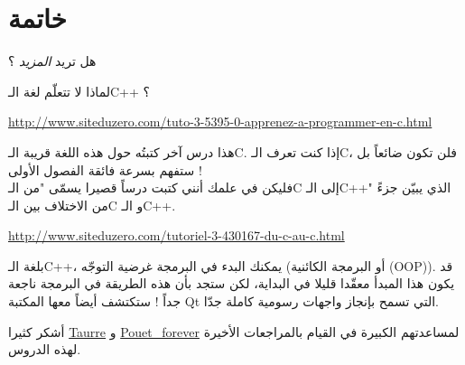 \chapter*{خاتمة}

هل تريد
\textit{المزيد}
؟

لماذا لا تتعلّم لغة الـ\textenglish{C++}
؟

\url{http://www.siteduzero.com/tuto-3-5395-0-apprenez-a-programmer-en-c.html}

 هذا درس آخر كتبتُه حول هذه اللغة قريبة الـ\textenglish{C}.
 إذا كنت تعرف الـ\textenglish{C}،
فلن تكون ضائعاً بل ستفهم بسرعة فائقة الفصول الأولى !\\
فليكن في علمك أنني كتبت درساً قصيرا يسمّى "من الـ\textenglish{C}
إلى الـ\textenglish{C++}"
الذي يبيّن جزءً من الاختلاف بين الـ\textenglish{C}
و الـ\textenglish{C++}.

\url{http://www.siteduzero.com/tutoriel-3-430167-du-c-au-c.html}

بلغة الـ\textenglish{C++}،
يمكنك البدء في البرمجة غرضية التوجّه (أو البرمجة الكائنية
(\textenglish{OOP})).
قد يكون هذا المبدأ معقّدا قليلا في البداية، لكن ستجد بأن هذه الطريقة في البرمجة ناجعة جداً ! ستكتشف أيضاً معها المكتبة
\textenglish{Qt}
التي تسمح بإنجاز واجهات رسومية كاملة جدّا.

أشكر كثيرا
\href{http://www.siteduzero.com/membres-294-45753.html}{Taurre}
و
\href{http://www.siteduzero.com/membres-294-181268.html}{Pouet\_forever}
لمساعدتهم الكبيرة في القيام بالمراجعات الأخيرة لهذه الدروس.
